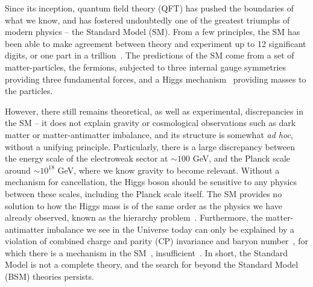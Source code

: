 Since its inception, quantum field theory (QFT) has pushed the boundaries of what we know, and has fostered undoubtedly one of the greatest triumphs of modern physics -- the Standard Model (SM). From a few principles, the SM has been able to make agreement between theory and experiment up to 12 significant digits, or one part in a trillion~\cite{g-2}.
The predictions of the SM come from a set of matter-particles, the fermions, subjected to three internal gauge symmetries~\cite{Yang:1954ek} providing three fundamental forces, and a Higgs mechanism~\cite{Higgs:1964pj} providing masses to the particles.

However, there still remains theoretical, as well as experimental, discrepancies in the SM -- it does not explain gravity or cosmological observations such as dark matter or matter-antimatter imbalance, and its structure is somewhat \emph{ad hoc}, without a unifying principle.
Particularly, there is a large discrepancy between the energy scale of the electroweak sector at \(\sim 100\) GeV, and the Planck scale around \(\sim 10^{18}\) GeV, where we know gravity to become relevant.
Without a mechanism for cancellation, the Higgs boson should be sensitive to any physics between these scales, including the Planck scale itself.
The SM provides no solution to how the Higgs mass is of the same order as the physics we have already observed, known as the hierarchy problem~\cite{hierchy1,hierchy2}.
Furthermore, the matter-antimatter imbalance we see in the Universe today can only be explained by a violation of combined charge and parity (CP) invariance and baryon number~\cite{Sakharov:1967dj}, for which there is a mechanism in the SM~\cite{CKM1,CKM2}, insufficient~\cite{SMBaryogenesis}.
In short, the Standard Model is not a complete theory, and the search for beyond the Standard Model (BSM) theories persists.
\medskip

